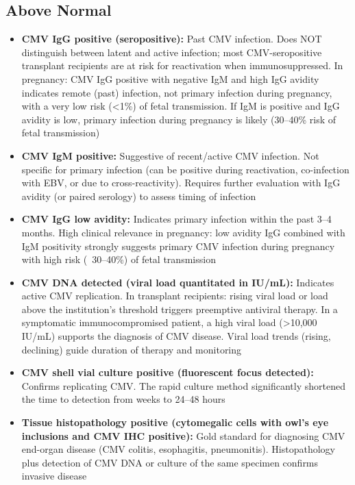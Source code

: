 \subsection*{Above Normal}
\begin{itemize}
  \item \textbf{CMV IgG positive (seropositive):} Past CMV infection. Does NOT distinguish between latent and active infection; most CMV-seropositive transplant recipients are at risk for reactivation when immunosuppressed. In pregnancy: CMV IgG positive with negative IgM and high IgG avidity indicates remote (past) infection, not primary infection during pregnancy, with a very low risk (<1\%) of fetal transmission. If IgM is positive and IgG avidity is low, primary infection during pregnancy is likely (30--40\% risk of fetal transmission)
  \item \textbf{CMV IgM positive:} Suggestive of recent/active CMV infection. Not specific for primary infection (can be positive during reactivation, co-infection with EBV, or due to cross-reactivity). Requires further evaluation with IgG avidity (or paired serology) to assess timing of infection
  \item \textbf{CMV IgG low avidity:} Indicates primary infection within the past 3--4 months. High clinical relevance in pregnancy: low avidity IgG combined with IgM positivity strongly suggests primary CMV infection during pregnancy with high risk (~30--40\%) of fetal transmission
  \item \textbf{CMV DNA detected (viral load quantitated in IU/mL):} Indicates active CMV replication. In transplant recipients: rising viral load or load above the institution's threshold triggers preemptive antiviral therapy. In a symptomatic immunocompromised patient, a high viral load (>10,000 IU/mL) supports the diagnosis of CMV disease. Viral load trends (rising, declining) guide duration of therapy and monitoring
  \item \textbf{CMV shell vial culture positive (fluorescent focus detected):} Confirms replicating CMV. The rapid culture method significantly shortened the time to detection from weeks to 24--48 hours
  \item \textbf{Tissue histopathology positive (cytomegalic cells with owl's eye inclusions and CMV IHC positive):} Gold standard for diagnosing CMV end-organ disease (CMV colitis, esophagitis, pneumonitis). Histopathology plus detection of CMV DNA or culture of the same specimen confirms invasive disease
\end{itemize}

